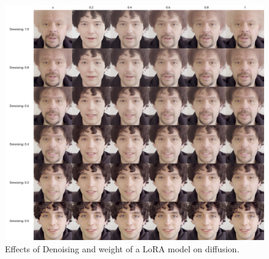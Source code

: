 \documentclass[preprint]{elsarticle}
\begin{document}
\begin{figure}[t]
	\centering
	\includegraphics[scale=0.2, keepaspectratio]{img/project_img/grid-santini.png}
	\caption{Effects of Denoising and weight of a LoRA model on diffusion.}
	\label{fig:grid-santini}
\end{figure}
\end{document}
